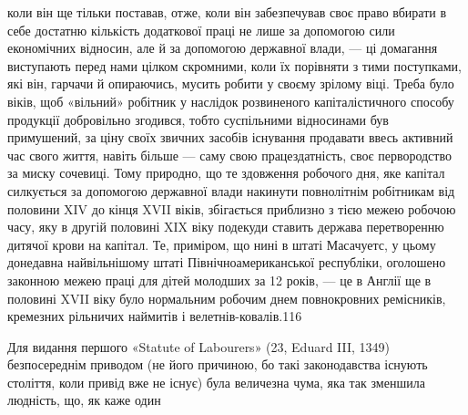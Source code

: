 коли він ще тільки поставав, отже, коли він забезпечував своє
право вбирати в себе достатню кількість додаткової праці не
лише за допомогою сили економічних відносин, але й за допомогою
державної влади, — ці домагання виступають перед нами
цілком скромними, коли їх порівняти з тими поступками, які
він, гарчачи й опираючись, мусить робити у своєму зрілому віці.
Треба було віків, щоб «вільний» робітник у наслідок розвиненого
капіталістичного способу продукції добровільно згодився, тобто
суспільними відносинами був примушений, за ціну своїх звичних
засобів існування продавати ввесь активний час свого
життя, навіть більше — саму свою працездатність, своє первородство
за миску сочевиці. Тому природно, що те здовження
робочого дня, яке капітал силкується за допомогою державної
влади накинути повнолітнім робітникам від половини XIV до
кінця XVII віків, збігається приблизно з тією межею робочою
часу, яку в другій половині XIX віку подекуди ставить держава
перетворенню дитячої крови на капітал. Те, приміром, що нині
в штаті Масачуетс, у цьому донедавна найвільнішому штаті
Північноамериканської республіки, оголошено законною межею
праці для дітей молодших за 12 років, — це в Англії ще в половині
XVII віку було нормальним робочим днем повнокровних ремісників,
кремезних рільничих наймитів і велетнів-ковалів.116

Для видання першого «Statute of Labourers» (23, Eduard
III, 1349) безпосереднім приводом (не його причиною, бо такі
законодавства існують століття, коли привід вже не існує) була
величезна чума, яка так зменшила людність, що, як каже один

